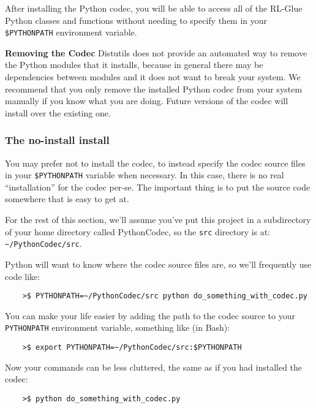 \documentclass[11pt]{article}
\begin{document}
After installing the Python codec, you will be able to access all of the RL-Glue Python classes and functions without needing to specify them in your 
\texttt{\$PYTHONPATH} environment variable.

\textbf{Removing the Codec}\newline
Distutils does not provide an automated way to remove the Python modules that it installs, because in general there may be dependencies between modules and it does not want to break your system. We recommend that you only remove the installed Python codec from your system manually if you know what you are doing.  Future versions of the codec will install over the existing one.



\subsubsection{The no-install install}
You may prefer not to install the codec, to instead specify the codec source files in your \texttt{\$PYTHONPATH} variable when necessary.  In this case, there is no real ``installation'' for the codec per-se.  The important thing is to put the source code somewhere that is easy to get at.

For the rest of this section, we'll assume you've put this project in a subdirectory of your home directory called PythonCodec, 
so the \texttt{src} directory is at: \texttt{\~{}/PythonCodec/src}.

Python will want to know where the codec source files are, so we'll frequently use code like:
\begin{verbatim}
	>$ PYTHONPATH=~/PythonCodec/src python do_something_with_codec.py
\end{verbatim}

You can make your life easier by adding the path to the codec source to your \texttt{PYTHONPATH} environment variable, something like (in Bash):
\begin{verbatim}
	>$ export PYTHONPATH=~/PythonCodec/src:$PYTHONPATH
\end{verbatim}

Now your commands can be less cluttered, the same as if you had installed the codec:
\begin{verbatim}
	>$ python do_something_with_codec.py
\end{verbatim}
\end{document}
